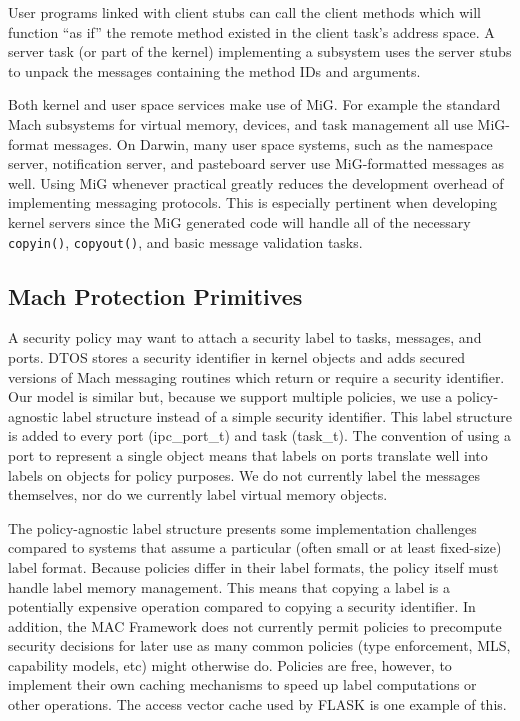 User programs linked with client stubs can call the client methods
which will function ``as if'' the remote method existed in the client
task's address space. A server task (or part of the kernel)
implementing a subsystem uses the server stubs to unpack the messages
containing the method IDs and arguments.

Both kernel and user space services make use of MiG. For example the
standard Mach subsystems for virtual memory, devices, and task
management all use MiG-format messages. On Darwin, many user space
systems, such as the namespace server, notification server, and
pasteboard server use MiG-formatted messages as well.  Using MiG
whenever practical greatly reduces the development overhead of
implementing messaging protocols. This is especially pertinent when
developing kernel servers since the MiG generated code will handle
all of the necessary {\tt copyin()}, {\tt copyout()}, and basic message
validation tasks.


\subsection{Mach Protection Primitives}

A security policy may want to attach a security label to
tasks, messages, and ports. DTOS stores a security identifier in
kernel objects and adds secured versions of Mach messaging routines
which return or require a security identifier. Our model is similar but,
because we support multiple policies, we use a policy-agnostic label
structure instead of a simple security identifier. This label
structure is added to every port (ipc\_port\_t) and task (task\_t).
The convention of using a port to represent a single object means
that labels on ports translate well into labels on objects for
policy purposes. We do not currently label the messages themselves,
nor do we currently label virtual memory objects.

The policy-agnostic label structure presents some implementation
challenges compared to systems that assume a particular (often small
or at least fixed-size) label format. Because policies differ in
their label formats, the policy itself must handle label memory
management.  This means that copying a label is a potentially
expensive operation compared to copying a security identifier. In
addition, the MAC Framework does not currently permit policies
to precompute security decisions for later use as many common
policies (type enforcement, MLS, capability models, etc) might
otherwise do.  Policies are free, however, to implement their own
caching mechanisms to speed up label computations or other operations.
The access vector cache used by FLASK is one example of this.

